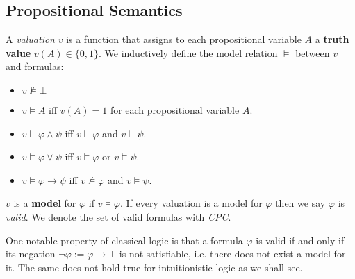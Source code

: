 \documentclass[a4paper,UKenglish,cleveref, autoref, thm-restate]{lipics-v2021}
\begin{document}
\subsection{Propositional Semantics}

\begin{definition}
	A \emph{valuation} $v$ is a function that assigns to each propositional variable $A$ a \textbf{truth value} $v(A)\in\{0, 1\}$. We inductively define the model relation $\models$ between $v$ and formulas:
	\begin{itemize}
		\item $v\not\models \bot$
		\item $v\models A$ iff $v(A) = 1$ for each propositional variable $A$.
		\item $v\models \varphi\wedge\psi$ iff $v\models\varphi$ and $v\models\psi$.
		\item $v\models\varphi\vee\psi$ iff $v\models\varphi$ or $v\models\psi$.
		\item $v\models\varphi\to \psi$ iff $v\not\models\varphi$ and $v\models\psi$.
	\end{itemize}
	$v$ is a \textbf{model} for $\varphi$ if $v\models\varphi$. If every valuation is a model for $\varphi$ then we say $\varphi$ is \emph{valid}. We denote the set of valid formulas with \emph{CPC}.
\end{definition}

One notable property of classical logic is that a formula $\varphi$ is valid if and only if its negation $\neg\varphi := \varphi\to\bot$ is not satisfiable, i.e. there does not exist a model for it. The same does not hold true for intuitionistic logic as we shall see.
\end{document}
